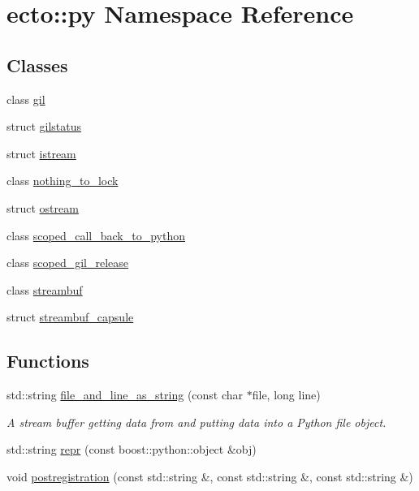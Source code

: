 \hypertarget{namespaceecto_1_1py}{}\section{ecto\+:\+:py Namespace Reference}
\label{namespaceecto_1_1py}
\subsection*{Classes}
\begin{DoxyCompactItemize}
\item 
class \hyperlink{classecto_1_1py_1_1gil}{gil}
\item 
struct \hyperlink{structecto_1_1py_1_1gilstatus}{gilstatus}
\item 
struct \hyperlink{structecto_1_1py_1_1istream}{istream}
\item 
class \hyperlink{classecto_1_1py_1_1nothing__to__lock}{nothing\+\_\+to\+\_\+lock}
\item 
struct \hyperlink{structecto_1_1py_1_1ostream}{ostream}
\item 
class \hyperlink{classecto_1_1py_1_1scoped__call__back__to__python}{scoped\+\_\+call\+\_\+back\+\_\+to\+\_\+python}
\item 
class \hyperlink{classecto_1_1py_1_1scoped__gil__release}{scoped\+\_\+gil\+\_\+release}
\item 
class \hyperlink{classecto_1_1py_1_1streambuf}{streambuf}
\item 
struct \hyperlink{structecto_1_1py_1_1streambuf__capsule}{streambuf\+\_\+capsule}
\end{DoxyCompactItemize}
\subsection*{Functions}
\begin{DoxyCompactItemize}
\item 
std\+::string \hyperlink{namespaceecto_1_1py_a103dc3e3c8ee425860ae2260f930752e}{file\+\_\+and\+\_\+line\+\_\+as\+\_\+string} (const char $\ast$file, long line)
\begin{DoxyCompactList}\small\item\em A stream buffer getting data from and putting data into a Python file object. \end{DoxyCompactList}\item 
std\+::string \hyperlink{namespaceecto_1_1py_abc1149eb9720c52fa9191bf7ee10ccf2}{repr} (const boost\+::python\+::object \&obj)
\item 
void \hyperlink{namespaceecto_1_1py_a9baa9f1e5394841101cbdc2eab37094c}{postregistration} (const std\+::string \&, const std\+::string \&, const std\+::string \&)
\end{DoxyCompactItemize}


